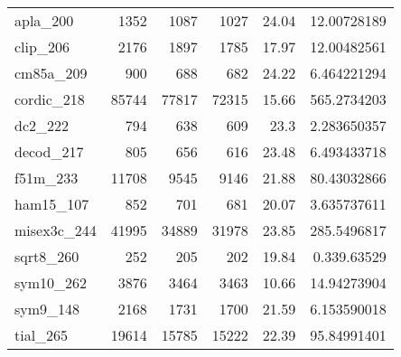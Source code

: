 \begin{table}[tbp]
\begin{tabular}{l|r|r|r|r|r}
      apla\_200                      &1352                      &1087                       &1027                       &24.04                               &12.00728189        \\
      clip\_206                      &2176                      &1897                       &1785                       &17.97                               &12.00482561        \\
      cm85a\_209                     &900                       &688                        &682                        &24.22                               &6.464221294        \\
      cordic\_218                    &85744                     &77817                      &72315                      &15.66                               &565.2734203        \\
      dc2\_222                       &794                       &638                        &609                        &23.3                                &2.283650357        \\
      decod\_217                     &805                       &656                        &616                        &23.48                               &6.493433718        \\
      f51m\_233                      &11708                     &9545                       &9146                       &21.88                               &80.43032866        \\
      ham15\_107                     &852                       &701                        &681                        &20.07                               &3.635737611        \\
      misex3c\_244                   &41995                     &34889                      &31978                      &23.85                               &285.5496817        \\
      sqrt8\_260                     &252                       &205                        &202                        &19.84                               &0.339.63529        \\
      sym10\_262                     &3876                      &3464                       &3463                       &10.66                               &14.94273904        \\
      sym9\_148                      &2168                      &1731                       &1700                       &21.59                               &6.153590018        \\
      tial\_265                      &19614                     &15785                      &15222                      &22.39                               &95.84991401        \\ \hline
  \end{tabular}
\end{table}

